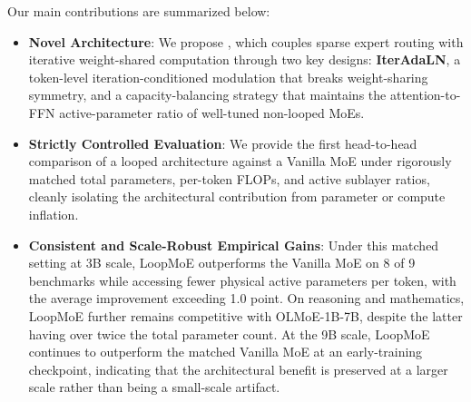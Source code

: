 Our main contributions are summarized below:
\begin{itemize}[leftmargin=*]
\item \textbf{Novel Architecture}: We propose \textbf{\ourmodelnospace}, which couples sparse expert routing with iterative weight-shared computation through two key designs: \textbf{IterAdaLN}, a token-level iteration-conditioned modulation that breaks weight-sharing symmetry, and a capacity-balancing strategy that maintains the attention-to-FFN active-parameter ratio of well-tuned non-looped MoEs.
\item \textbf{Strictly Controlled Evaluation}: We provide the first head-to-head comparison of a looped architecture against a Vanilla MoE under rigorously matched total parameters, per-token FLOPs, and active sublayer ratios, cleanly isolating the architectural contribution from parameter or compute inflation.
\item \textbf{Consistent and Scale-Robust Empirical Gains}: Under this matched setting at 3B scale, LoopMoE outperforms the Vanilla MoE on 8 of 9 benchmarks while accessing fewer physical active parameters per token, with the average improvement exceeding 1.0 point. On reasoning and mathematics, LoopMoE further remains competitive with OLMoE-1B-7B, despite the latter having over twice the total parameter count. At the 9B scale, LoopMoE continues to outperform the matched Vanilla MoE at an early-training checkpoint, indicating that the architectural benefit is preserved at a larger scale rather than being a small-scale artifact.
\end{itemize}